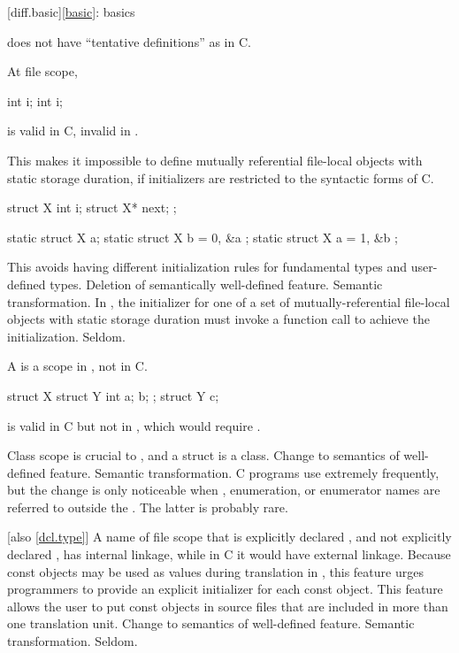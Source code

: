 [diff.basic]{\ref{basic}: basics}

\change
\Cpp{} does not have ``tentative definitions'' as in C.
\begin{example}
At file scope,
\begin{codeblock}
int i;
int i;
\end{codeblock}
is valid in C, invalid in \Cpp{}.
\end{example}
This makes it impossible to define
mutually referential file-local objects with static storage duration,
if initializers are restricted to the syntactic forms of C\@.
\begin{example}
\begin{codeblock}
struct X { int i; struct X* next; };

static struct X a;
static struct X b = { 0, &a };
static struct X a = { 1, &b };
\end{codeblock}
\end{example}
\rationale
This avoids having different initialization rules for
fundamental types and user-defined types.
\effect
Deletion of semantically well-defined feature.
\difficulty
Semantic transformation.
In \Cpp{}, the initializer for one of a set of
mutually-referential file-local objects with static storage
duration must invoke a function
call to achieve the initialization.
\howwide
Seldom.

\change
A  is a scope in \Cpp{}, not in C.
\begin{example}
\begin{codeblock}
struct X {
  struct Y { int a; } b;
};
struct Y c;
\end{codeblock}
is valid in C but not in \Cpp{}, which would require .
\end{example}
\rationale
Class scope is crucial to \Cpp{}, and a struct is a class.
\effect
Change to semantics of well-defined feature.
\difficulty
Semantic transformation.
\howwide
C programs use  extremely frequently, but the
change is only noticeable when , enumeration, or enumerator
names are referred to outside the .
The latter is probably rare.

 [also \ref{dcl.type}]
\change
A name of file scope that is explicitly declared , and not explicitly
declared , has internal linkage, while in C it would have external linkage.
\rationale
Because const objects may be used as values during translation in
\Cpp{}, this feature urges programmers to provide an explicit initializer
for each const object.
This feature allows the user to put const objects in source files that are included
in more than one translation unit.
\effect
Change to semantics of well-defined feature.
\difficulty
Semantic transformation.
\howwide
Seldom.

